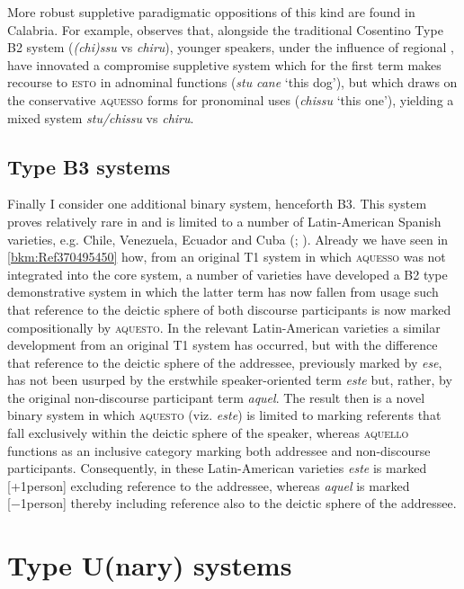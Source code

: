 \documentclass[output=paper]{langsci/langscibook}
\begin{document}
More robust suppletive paradigmatic oppositions of this kind are found in
Calabria. For example, \citet[107]{ledgeway2004sviluppo} observes that,
alongside the traditional Cosentino Type B\textsc{2}\textsc{} system
(\emph{(chi)ssu} vs \emph{chiru}), younger speakers, under the influence of
regional , have innovated a compromise suppletive system which for the
first term makes recourse to \textsc{esto} in adnominal functions (\emph{stu}
\emph{cane} ‘this dog’), but which draws on the conservative \textsc{aquesso}
forms for pronominal uses (\emph{chissu} ‘this one’), yielding a mixed system
\emph{stu/chissu} vs \emph{chiru}.

\subsection{Type B3 systems}

Finally I consider one additional binary system, henceforth B3. This system
proves relatively rare in  and is limited to a number of Latin-American
Spanish varieties, e.g. Chile, Venezuela, Ecuador and Cuba
(\citealt[434]{Zamora-Vicente:1967a}; \citealt[171]{Bruyne:1995a}). Already we
have seen in \cref{bkm:Ref370495450} how, from an original T1 system in which
\textsc{aquesso} was not integrated into the core system, a number of 
varieties have developed a B2 type demonstrative system in which the
latter term has now fallen from usage such that reference to the deictic sphere
of both discourse participants is now marked compositionally by
\textsc{aquesto}. In the relevant Latin-American  varieties a similar
development from an original T1 system has occurred, but with the difference
that reference to the deictic sphere of the addressee, previously marked by
\emph{ese}, has not been usurped by the erstwhile speaker-oriented term
\emph{este} but, rather, by the original non-discourse participant term
\emph{aquel}. The result then is a novel binary system in which
\textsc{aquesto} (viz. \emph{este}) is limited to marking referents that fall
exclusively within the deictic sphere of the speaker, whereas \textsc{aquello}
functions as an inclusive category marking both addressee and non-discourse
participants. Consequently, in these Latin-American varieties \emph{este} is
marked [+1person] excluding reference to the addressee, whereas \emph{aquel} is
marked [−1person] thereby including reference also to the deictic sphere of the
addressee.

\section{Type U(nary) systems}\label{bkm:Ref370483115}
\end{document}
